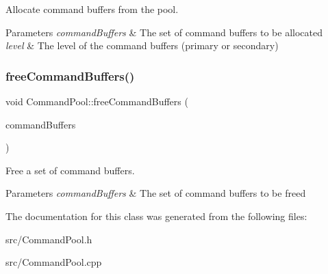 Allocate command buffers from the pool. 


\begin{DoxyParams}{Parameters}
{\em command\+Buffers} & The set of command buffers to be allocated \\
\hline
{\em level} & The level of the command buffers (primary or secondary) \\
\hline
\end{DoxyParams}
\mbox{\label{class_command_pool_a556f939f99a7044cc9e3292750c8a749}} 
\subsubsection{\texorpdfstring{freeCommandBuffers()}{freeCommandBuffers()}}
{\footnotesize\ttfamily void Command\+Pool\+::free\+Command\+Buffers (\begin{DoxyParamCaption}\item[{std\+::vector$<$ Vk\+Command\+Buffer $>$ \&}]{command\+Buffers }\end{DoxyParamCaption})}



Free a set of command buffers. 


\begin{DoxyParams}{Parameters}
{\em command\+Buffers} & The set of command buffers to be freed \\
\hline
\end{DoxyParams}


The documentation for this class was generated from the following files\+:\begin{DoxyCompactItemize}
\item 
src/Command\+Pool.\+h\item 
src/Command\+Pool.\+cpp\end{DoxyCompactItemize}
